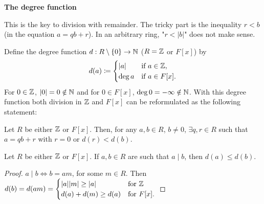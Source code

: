 \documentclass[10pt, a4paper]{article}
\begin{document}
\textbf{The degree function}

This is the key to division with remainder.
The tricky part is the inequality $r < b$
(in the equation $a = qb + r$).
In an arbitrary ring,
"$r < |b|$"
does not make sense.

Define the degree function $d : R \setminus \{0\} \to \mathbb{N}$
($R = \mathbb{Z}$ or $F[x]$)
by
\[
d(a) \coloneqq \begin{cases}
    |a| &\text{if } a \in \mathbb{Z}, \\
    \deg{a} &\text{if } a \in F[x].
\end{cases}
\]
For $0 \in \mathbb{Z}$,
$|0| = 0 \notin \mathbb{N}$ and for $0 \in F[x]$,
$\deg{0} = -\infty \notin \mathbb{N}$.
With this degree function both division in $\mathbb{Z}$ and $F[x]$ can be reformulated as the following statement:

\begin{proposition}\label{algII:prop:genremdiv}
    Let $R$ be either $\mathbb{Z}$ or $F[x]$.
    Then,
    for any $a, b \in R$,
    $b \neq 0$,
    $\exists q, r \in R$ such that $a = qb + r$ with $r = 0$ or $d(r) < d(b)$.
\end{proposition}

\begin{lemma}\label{algII:lem:degfunlessifdiv}
    Let $R$ be either $\mathbb{Z}$ or $F[x]$.
    If $a, b \in R$ are such that $a \mid b$,
    then $d(a) \leq d(b)$.

    \begin{proof}
        $a \mid b \iff b = am$,
        for some $m \in R$.
        Then $d(b) = d(am) = \begin{cases}
            |a||m| \geq |a| &\text{for } \mathbb{Z} \\
            d(a) + d(m) \geq d(a) &\text{for } F[x].
        \end{cases}$
    \end{proof}
\end{lemma}
\end{document}
